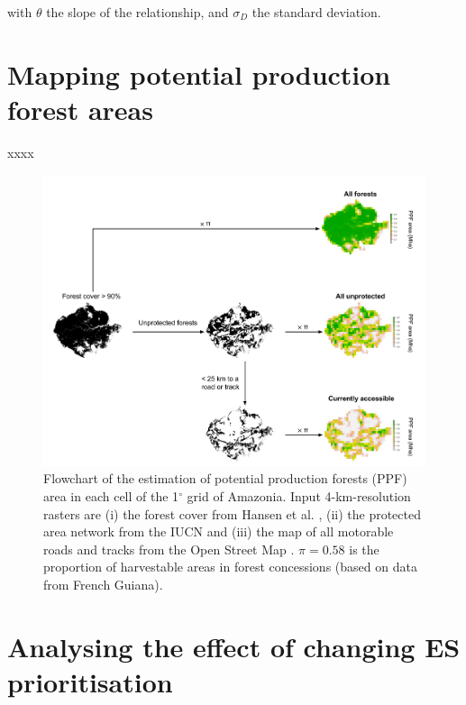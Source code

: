 \documentclass{article}
\begin{document}
with $\theta$ the slope of the relationship, and $\sigma_D$ the standard deviation. 


\clearpage

\section{Mapping potential production forest areas}

\label{sec:defPPF}

xxxx

\begin{figure}
    \centering
    \includegraphics[width=\linewidth]{graphs/PPFareaDiagram.pdf}
    \caption{Flowchart of the estimation of potential production forests (PPF) area in each cell of the 1$^{\circ}$ grid of Amazonia. Input 4-km-resolution rasters are (i) the forest cover from Hansen et al. \cite{Hansen2013}, (ii) the protected area network from the IUCN \cite{WDPA2016} and (iii) the map of all motorable roads and tracks from the Open Street Map \cite{OSM2018}. $\pi = 0.58$ is the proportion of harvestable areas in forest concessions (based on data from French Guiana). }
    \label{fig:ppfDiagram}
\end{figure}

\clearpage

\section{Analysing the effect of changing ES prioritisation}
\label{supsec:changeCost}
\end{document}

